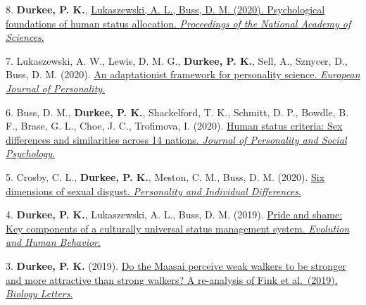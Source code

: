 \documentclass[10pt,]{article}
\begin{document}
8.\hangindent=0.5in
\marginpar{\scriptsize{\faLightbulbO\faTable\faBarChart\faPencil}}
\marginpar{\textsuperscript{\faDatabase\faFileCodeO}} \textbf{Durkee, P.
K.},
\href{http://www.pdurkee.com/files/pubs/DurkeeLukaszewskiBuss2020_PsychologicalFoundationsofHumanStatusAllocation.pdf}{Lukaszewski,
A. L., Buss, D. M. (2020). Psychological foundations of human status
allocation. \emph{Proceedings of the National Academy of Sciences}.}

7.\hangindent=0.5in \marginpar{\scriptsize{\faBarChart\faPencil}}
\marginpar{\textsuperscript{\faDatabase\faFileCodeO}} Lukaszewski, A.
W., Lewis, D. M. G., \textbf{Durkee, P. K.}, Sell, A., Sznycer, D.,
Buss, D. M. (2020).
\href{http://www.pdurkee.com/files/pubs/AnAdaptationistFrameworkPersonality.pdf}{An
adaptationist framework for personality science. \emph{European Journal
of Personality}.}

6.\hangindent=0.5in \marginpar{\scriptsize{\faBarChart\faPencil}}
\marginpar{\textsuperscript{\faDatabase\faFileCodeO}} Buss, D.
M.\textsuperscript{\faUnsorted}, \textbf{Durkee, P.
K.}\textsuperscript{\faUnsorted}, Shackelford, T. K., Schmitt, D. P.,
Bowdle, B. F., Brase, G. L., Choe, J. C., Trofimova, I. (2020).
\href{http://www.pdurkee.com/files/pubs/Buss&Durkee_etal_HumanStatusCriteria.pdf}{Human
status criteria: Sex differences and similarities across 14 nations.
\emph{Journal of Personality and Social Psychology}.}

5.\hangindent=0.5in \marginpar{\scriptsize{\faBarChart\faPencil}}
\marginpar{\textsuperscript{}} Crosby, C. L., \textbf{Durkee, P. K.},
Meston, C. M., Buss, D. M. (2020).
\href{https://labs.la.utexas.edu/mestonlab/files/2019/12/1-s2.0-S0191886919306543-main.pdf}{Six
dimensions of sexual disgust. \emph{Personality and Individual
Differences}.}

4.\hangindent=0.5in
\marginpar{\scriptsize{\faLightbulbO\faTable\faBarChart\faPencil}}
\marginpar{\textsuperscript{\faCheckCircle\faDatabase\faFileCodeO}}
\textbf{Durkee, P. K.}, Lukaszewski, A. L., Buss, D. M. (2019).
\href{http://www.pdurkee.com/files/pubs/DurkeeLukaszewskiBuss_PrideShame_2019.pdf}{Pride
and shame: Key components of a culturally universal status management
system. \emph{Evolution and Human Behavior}.}

3.\hangindent=0.5in
\marginpar{\scriptsize{\faLightbulbO\faBarChart\faPencil}}
\marginpar{\textsuperscript{\faFileCodeO}} \textbf{Durkee, P. K.}
(2019). \href{http://www.pdurkee.com/files/pubs/Durkee_2019.pdf}{Do the
Maasai perceive weak walkers to be stronger and more attractive than
strong walkers? A re-analysis of Fink et al.~(2019). \emph{Biology
Letters}.}
\end{document}
